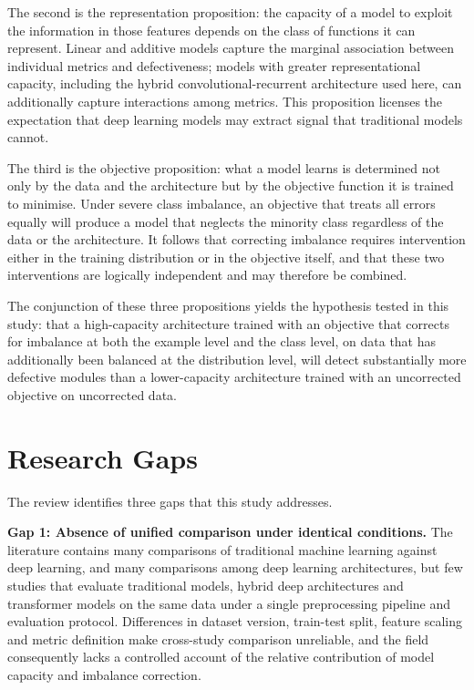 \documentclass[12pt,a4paper,oneside]{report}
\begin{document}
The second is the representation proposition: the capacity of a model to exploit the information in those features depends on the class of functions it can represent. Linear and additive models capture the marginal association between individual metrics and defectiveness; models with greater representational capacity, including the hybrid convolutional-recurrent architecture used here, can additionally capture interactions among metrics. This proposition licenses the expectation that deep learning models may extract signal that traditional models cannot.

The third is the objective proposition: what a model learns is determined not only by the data and the architecture but by the objective function it is trained to minimise. Under severe class imbalance, an objective that treats all errors equally will produce a model that neglects the minority class regardless of the data or the architecture. It follows that correcting imbalance requires intervention either in the training distribution or in the objective itself, and that these two interventions are logically independent and may therefore be combined.

The conjunction of these three propositions yields the hypothesis tested in this study: that a high-capacity architecture trained with an objective that corrects for imbalance at both the example level and the class level, on data that has additionally been balanced at the distribution level, will detect substantially more defective modules than a lower-capacity architecture trained with an uncorrected objective on uncorrected data.

\section{Research Gaps}

The review identifies three gaps that this study addresses.

\textbf{Gap 1: Absence of unified comparison under identical conditions.} The literature contains many comparisons of traditional machine learning against deep learning, and many comparisons among deep learning architectures, but few studies that evaluate traditional models, hybrid deep architectures and transformer models on the same data under a single preprocessing pipeline and evaluation protocol. Differences in dataset version, train-test split, feature scaling and metric definition make cross-study comparison unreliable, and the field consequently lacks a controlled account of the relative contribution of model capacity and imbalance correction.
\end{document}
